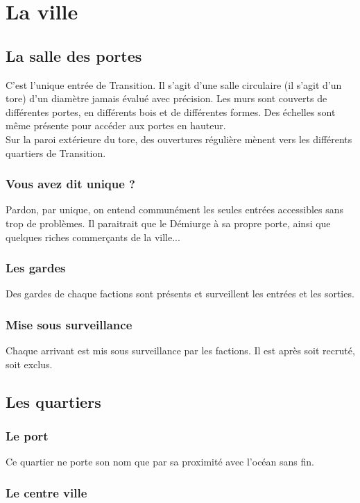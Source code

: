 \documentclass{book}
\begin{document}
\chapter{La ville}
\section{La salle des portes}
C'est l'unique entrée de Transition. Il s'agit d'une salle circulaire (il s'agit d'un tore) d'un diamètre jamais évalué avec précision. Les murs sont couverts de différentes portes, en différents bois et de différentes formes. Des échelles sont même présente pour accéder aux portes en hauteur.\\
Sur la paroi extérieure du tore, des ouvertures régulière mènent vers les différents quartiers de Transition.
\subsection{Vous avez dit unique ?}
Pardon, par unique, on entend communément les seules entrées accessibles sans trop de problèmes. Il paraitrait que le Démiurge à sa propre porte, ainsi que quelques riches commerçants de la ville...

\subsection{Les gardes}
Des gardes de chaque factions sont présents et surveillent les entrées et les sorties.

\subsection{Mise sous surveillance}
Chaque arrivant est mis sous surveillance par les factions. Il est après soit recruté, soit exclus.

\section{Les quartiers}
\subsection{Le port}
Ce quartier ne porte son nom que par sa proximité avec l'océan sans fin. 
\subsection{Le centre ville}
\end{document}
